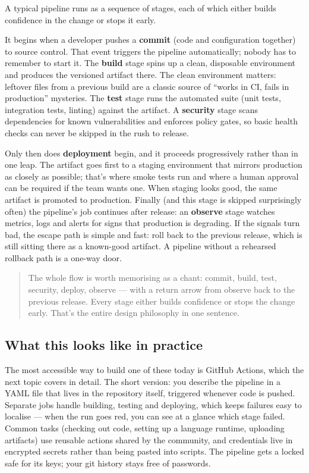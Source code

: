 A typical pipeline runs as a sequence of stages, each of which either builds confidence in the change or stops it early.


It begins when a developer pushes a \textbf{commit} (code and configuration together) to source control. That event triggers the pipeline automatically; nobody has to remember to start it. The \textbf{build} stage spins up a clean, disposable environment and produces the versioned artifact there. The clean environment matters: leftover files from a previous build are a classic source of ``works in CI, fails in production'' mysteries. The \textbf{test} stage runs the automated suite (unit tests, integration tests, linting) against the artifact. A \textbf{security} stage scans dependencies for known vulnerabilities and enforces policy gates, so basic health checks can never be skipped in the rush to release.


Only then does \textbf{deployment} begin, and it proceeds progressively rather than in one leap. The artifact goes first to a staging environment that mirrors production as closely as possible; that's where smoke tests run and where a human approval can be required if the team wants one. When staging looks good, the same artifact is promoted to production. Finally (and this stage is skipped surprisingly often) the pipeline's job continues after release: an \textbf{observe} stage watches metrics, logs and alerts for signs that production is degrading. If the signals turn bad, the escape path is simple and fast: roll back to the previous release, which is still sitting there as a known-good artifact. A pipeline without a rehearsed rollback path is a one-way door.



\begin{quote}\small
The whole flow is worth memorising as a chant: commit, build, test, security, deploy, observe — with a return arrow from observe back to the previous release. Every stage either builds confidence or stops the change early. That's the entire design philosophy in one sentence.
\end{quote}



\subsection{What this looks like in practice}


The most accessible way to build one of these today is GitHub Actions, which the next topic covers in detail. The short version: you describe the pipeline in a YAML file that lives in the repository itself, triggered whenever code is pushed. Separate jobs handle building, testing and deploying, which keeps failures easy to localise — when the run goes red, you can see at a glance which stage failed. Common tasks (checking out code, setting up a language runtime, uploading artifacts) use reusable actions shared by the community, and credentials live in encrypted secrets rather than being pasted into scripts. The pipeline gets a locked safe for its keys; your git history stays free of passwords.



